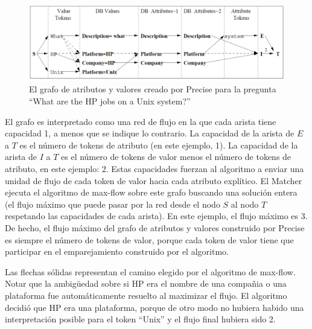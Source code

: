 \begin{figure}
  \centering
    \includegraphics[scale=0.5]{graficos/popescu-example-2}
  \caption{El grafo de atributos y valores creado por Precise para la pregunta ``What are the HP jobs on a Unix system?''}
  \label{fig:popescu-example-2}
\end{figure}



El grafo es interpretado como una red de flujo en la que cada arista tiene capacidad 1, a menos que se indique lo contrario. La capacidad de la arista de $E$ a $T$ es el número de tokens de atributo (en este ejemplo, 1). La capacidad de la arista de $I$ a $T$ es el número de tokens de valor menos el número de tokens de atributo, en este ejemplo: 2. Estas capacidades fuerzan al algoritmo a enviar una unidad de flujo de cada token de valor hacia cada atributo explítico. El Matcher ejecuta el algoritmo de max-flow sobre este grafo buscando una solución entera (el flujo máximo que puede pasar por la red desde el nodo $S$ al nodo $T$ respetando las capacidades de cada arista). En este ejemplo, el flujo máximo es 3. De hecho, el flujo máximo del grafo de atributos y valores construido por Precise es siempre el número de tokens de valor, porque cada token de valor tiene que participar en el emparejamiento construido por el algoritmo.

Las flechas sólidas representan el camino elegido por el algoritmo de max-flow. Notar que la ambigüedad sobre si HP era el nombre de una compañia o una plataforma fue automáticamente resuelto al maximizar el flujo. El algoritmo decidió que HP era una plataforma, porque de otro modo no hubiera habido una interpretación posible para el token ``Unix'' y el flujo final hubiera sido 2.

